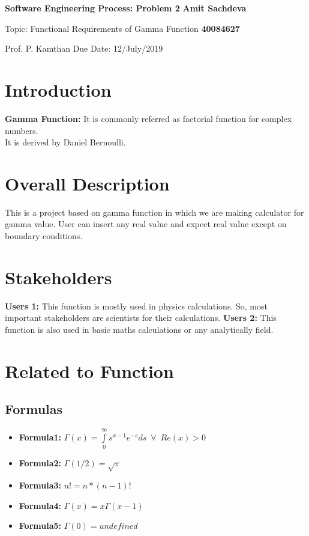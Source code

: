 \documentclass{article}
\begin{document}
\noindent
\large\textbf{Software Engineering Process: Problem 2} \hfill \textbf{Amit Sachdeva} 

\normalsize Topic: Functional Requirements of Gamma Function \hfill \textbf{40084627} 

Prof. P. Kamthan \hfill Due Date: 12/July/2019

\section{Introduction} 
\textbf{Gamma Function: } It is commonly referred as factorial function for complex numbers.\\  It is derived by Daniel Bernoulli.

\section{Overall Description} 
This is a project based on gamma function in which we are making calculator for gamma value. User can insert any real value and expect real value except on boundary conditions.

\section{Stakeholders} 
\textbf{Users 1:} This function is mostly used in physics calculations. So, most important stakeholders are scientists for their calculations.
\newline
\textbf{Users 2:} This function is also used in basic maths calculations or any analytically field. 



\section{Related to Function}
\subsection{Formulas}
\begin{itemize}
\item \textbf{Formula1: } $  \Gamma \left( x \right) = \int\limits_0^\infty {s^{x - 1} e^{ - s} ds} \enspace \forall \enspace Re(x)>0$
\item \textbf{Formula2: } $  \Gamma \left( 1/2 \right) = \sqrt{\pi}$
\item \textbf{Formula3: } $  n! = n*(n-1)!$
\item \textbf{Formula4: } $  \Gamma \left( x \right) = x\Gamma \left( x-1\right) $
\item \textbf{Formula5: } $  \Gamma \left( 0 \right) = undefined $
\end{itemize}
\end{document}

